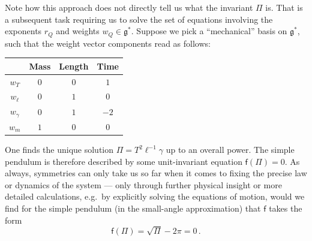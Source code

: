 \documentclass[12pt]{article}
\numberwithin{equation}{section}
\begin{document}
Note how this approach does not directly tell us what the invariant $\Pi$ is. That is a subsequent task requiring us to solve the set of equations involving the exponents $r_Q$ and weights $w_Q\in\mathfrak{g}^*$. Suppose we pick a ``mechanical'' basis on $\mathfrak{g}^*$, such that the weight vector components read as follows:
\begin{table}[H]
    \centering
    \begin{tabular}{c*{3}{c}}
         & Mass & Length & Time\\ \hline
        $w_T$ & $0$ & $0$ & $1$\\
        $w_\ell$ & $0$ & $1$ & $0$\\
        $w_\gamma$ & $0$ & $1$ & $-2$\\
        $w_m$ & $1$ & $0$ & $0$\\
    \end{tabular}
\end{table}
One finds the unique solution $\Pi = T^2\ell^{-1}\gamma$ up to an overall power. The simple pendulum is therefore described by some unit-invariant equation $\mathsf{f}(\Pi)=0$. As always, symmetries can only take us so far when it comes to fixing the precise law or dynamics of the system --- only through further physical insight or more detailed calculations, e.g.~by explicitly solving the equations of motion, would we find for the simple pendulum (in the small-angle approximation) that $\mathsf{f}$ takes the form
\begin{equation}
    \mathsf{f}(\Pi) = \sqrt{\Pi}-2\pi=0\,.
\end{equation}
\end{document}
